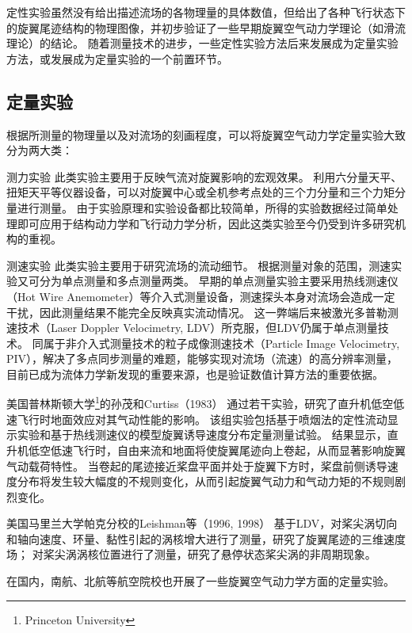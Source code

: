 定性实验虽然没有给出描述流场的各物理量的具体数值，但给出了各种飞行状态下的旋翼尾迹结构的物理图像，并初步验证了一些早期旋翼空气动力学理论（如滑流理论）的结论。
随着测量技术的进步，一些定性实验方法后来发展成为定量实验方法，或发展成为定量实验的一个前置环节。

\subsection{定量实验}
根据所测量的物理量以及对流场的刻画程度，可以将旋翼空气动力学定量实验大致分为两大类：
\begin{compactdesc}
  \item[测力实验]
  此类实验主要用于反映气流对旋翼影响的宏观效果。
  利用六分量天平、扭矩天平等仪器设备，可以对旋翼中心或全机参考点处的三个力分量和三个力矩分量进行测量。
  由于实验原理和实验设备都比较简单，所得的实验数据经过简单处理即可应用于结构动力学和飞行动力学分析，因此这类实验至今仍受到许多研究机构的重视。
  \item[测速实验]
  此类实验主要用于研究流场的流动细节。
  根据测量对象的范围，测速实验又可分为单点测量和多点测量两类。
  早期的单点测量实验主要采用热线测速仪（Hot Wire Anemometer）等介入式测量设备，测速探头本身对流场会造成一定干扰，因此测量结果不能完全反映真实流动情况。
  这一弊端后来被激光多普勒测速技术（Laser Doppler Velocimetry, LDV）所克服，但LDV仍属于单点测量技术。
  同属于非介入式测量技术的粒子成像测速技术（Particle Image Velocimetry, PIV），解决了多点同步测量的难题，能够实现对流场（流速）的高分辨率测量，
  目前已成为流体力学新发现的重要来源，也是验证数值计算方法的重要依据。
\end{compactdesc}

美国普林斯顿大学\footnote{Princeton University}的孙茂和Curtiss（1983）
通过若干实验，研究了直升机低空低速飞行时地面效应对其气动性能的影响。
该组实验包括基于喷烟法的定性流动显示实验和基于热线测速仪的模型旋翼诱导速度分布定量测量试验。
结果显示，直升机低空低速飞行时，自由来流和地面将使旋翼尾迹向上卷起，从而显著影响旋翼气动载荷特性。
当卷起的尾迹接近桨盘平面并处于旋翼下方时，桨盘前侧诱导速度分布将发生较大幅度的不规则变化，从而引起旋翼气动力和气动力矩的不规则剧烈变化。

美国马里兰大学帕克分校的Leishman等（1996, 1998）
基于LDV，对桨尖涡切向和轴向速度、环量、黏性引起的涡核增大进行了测量，研究了旋翼尾迹的三维速度场；
对桨尖涡涡核位置进行了测量，研究了悬停状态桨尖涡的非周期现象。

在国内，南航、北航等航空院校也开展了一些旋翼空气动力学方面的定量实验。

